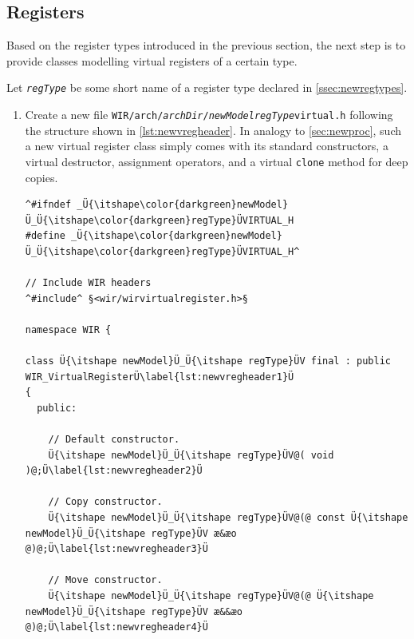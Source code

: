 \subsection{Registers}
\label{ssec:newregs}

Based on the register types introduced in the previous section, the next step is to provide classes modelling virtual registers of a certain type.

\begin{wirNote}
Let \texttt{\itshape regType} be some short name of a register type declared in \cref{ssec:newregtypes}.
\end{wirNote}

\begin{enumerate}[resume]
  \item Create a new file \texttt{WIR/arch/{\itshape archDir}/{\itshape newModelregType}virtual.h} following the structure shown in \cref{lst:newvregheader}.
  In analogy to \cref{sec:newproc}, such a new virtual register class simply comes with its standard constructors, a virtual destructor, assignment operators, and a virtual \texttt{clone} method for deep copies.

\begin{lstlisting}[style=code,float=!t,caption={Header File for a New Virtual Register's Class},label=lst:newvregheader]
^#ifndef _Ü{\itshape\color{darkgreen}newModel}Ü_Ü{\itshape\color{darkgreen}regType}ÜVIRTUAL_H
#define _Ü{\itshape\color{darkgreen}newModel}Ü_Ü{\itshape\color{darkgreen}regType}ÜVIRTUAL_H^

// Include WIR headers
^#include^ §<wir/wirvirtualregister.h>§

namespace WIR {

class Ü{\itshape newModel}Ü_Ü{\itshape regType}ÜV final : public WIR_VirtualRegisterÜ\label{lst:newvregheader1}Ü
{
  public:

    // Default constructor.
    Ü{\itshape newModel}Ü_Ü{\itshape regType}ÜV@( void )@;Ü\label{lst:newvregheader2}Ü

    // Copy constructor.
    Ü{\itshape newModel}Ü_Ü{\itshape regType}ÜV@(@ const Ü{\itshape newModel}Ü_Ü{\itshape regType}ÜV æ&æo @)@;Ü\label{lst:newvregheader3}Ü

    // Move constructor.
    Ü{\itshape newModel}Ü_Ü{\itshape regType}ÜV@(@ Ü{\itshape newModel}Ü_Ü{\itshape regType}ÜV æ&&æo @)@;Ü\label{lst:newvregheader4}Ü


\end{lstlisting}
\end{enumerate}
